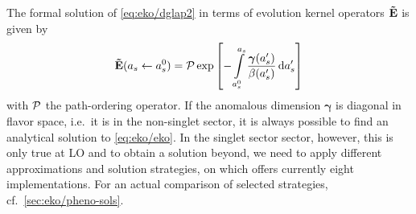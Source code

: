 The formal solution of \cref{eq:eko/dglap2} in terms of evolution kernel
operators $\vb {\tilde E}$ is given by
\begin{equation}
    \vb {\tilde E}(a_s \leftarrow a_s^0)  = \mathcal{P} \exp\qty[-\int\limits_{a_s^0}^{a_s} \frac{\bm{\gamma}(a_s')}{\beta(a_s')} \dd{a_s'} ]
    \label{eq:eko/eko}
\end{equation}
with $\mathcal{P}$ the path-ordering operator. If the anomalous dimension $\bm{\gamma}$ is
diagonal in flavor space, i.e.\ it is in the non-singlet sector, it is always
possible to find an analytical solution to \cref{eq:eko/eko}. 
In the singlet sector sector, however, this is only true at LO and to obtain a
solution beyond, we need to apply different approximations and solution
strategies, on which \eko{} offers currently eight implementations. For an
actual comparison of selected strategies, cf.\ \cref{sec:eko/pheno-sols}.
